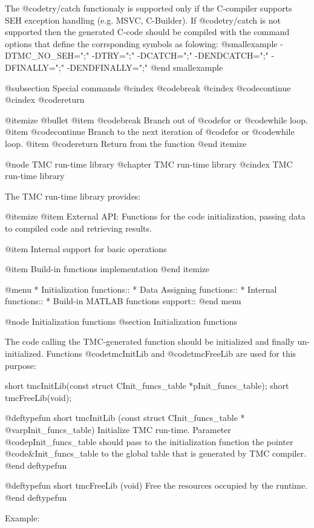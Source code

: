 The @code{try/catch} functionaly is supported only if the C-compiler supports SEH exception handling (e.g. MSVC, C-Builder).
If @code{try/catch} is not supported then the generated C-code should be compiled with the command options that define the corrsponding  symbols as folowing:
@smallexample
-DTMC_NO_SEH=";"  -DTRY=";" -DCATCH=";" -DENDCATCH=";" -DFINALLY=";"  -DENDFINALLY=";"
@end smallexample

@subsection Special commands
@cindex  @code{break}
@cindex  @code{continue}
@cindex  @code{return}

@itemize @bullet
@item @code{break}
Branch out of @code{for} or @code{while} loop.
@item @code{continue}
Branch to the next iteration of @code{for} or @code{while} loop.
@item @code{return}
Return from the function
@end itemize




@node TMC run-time library
@chapter TMC run-time library
@cindex TMC run-time library

The TMC run-time library provides:

@itemize
@item External API:
Functions for the code initialization, passing data to compiled code and  retrieving results. 

@item Internal support for basic operations

@item Build-in functions implementation
@end itemize

@menu
*  Initialization functions::
* Data Assigning functions::
* Internal functions::
* Build-in MATLAB functions support::
@end menu

@node Initialization functions
@section  Initialization functions

The code calling the TMC-generated function should be initialized and finally un-initialized. Functions @code{tmcInitLib} and @code{tmcFreeLib} are used for this purpose:

short tmcInitLib(const struct CInit_funcs_table *pInit_funcs_table);
short tmcFreeLib(void);



@deftypefun short tmcInitLib (const struct CInit_funcs_table *  @var{pInit_funcs_table})
Initialize TMC run-time. Parameter @code{pInit_funcs_table}  should pass to the initialization function the pointer @code{&Init_funcs_table} to the global table that is generated by TMC compiler. 
@end deftypefun


@deftypefun short  tmcFreeLib (void)
Free the resources occupied by the runtime.
@end deftypefun

Example:

